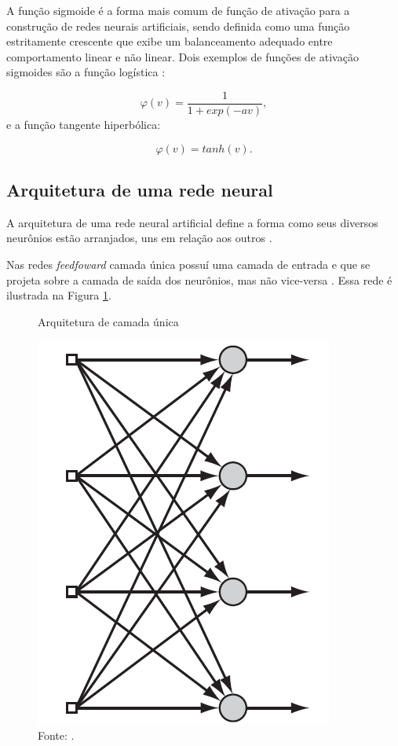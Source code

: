 A função sigmoide é a forma mais comum de função de ativação para a construção de redes neurais artificiais, sendo definida como uma função estritamente crescente que exibe um balanceamento adequado entre comportamento linear e não linear. Dois exemplos de funções de ativação sigmoides são a função logística \cite{haykin}:

\begin{equation}
	\varphi(v) = \frac{1}{1 + exp(-av)},
\end{equation}
e a função tangente hiperbólica:

\begin{equation}
	\varphi(v) = tanh(v).
\end{equation}

\subsection{Arquitetura de uma rede neural}

A arquitetura de uma rede neural artificial define  a forma como seus diversos neurônios estão arranjados, uns em relação aos outros \cite{Redes_cursopratico}.

Nas redes \textit{feedfoward} camada única possuí uma camada de entrada e que se projeta sobre a camada de saída dos neurônios, mas não vice-versa \cite{haykin}. Essa rede é ilustrada na Figura \ref{fig:camadaUnica}.

\begin{figure}[H]
	\vspace{4mm}
	\centering
	\caption{Arquitetura de camada única}
	\label{fig:camadaUnica}
	\includegraphics[scale=0.5]{imagens/rede_single}
	\caption*{Fonte: .}
\end{figure}


